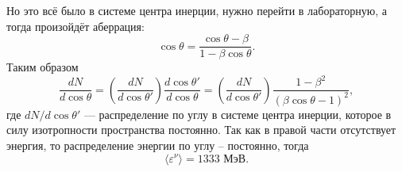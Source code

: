 Но это всё было в системе центра инерции, нужно перейти в лабораторную, а тогда произойдёт аберрация:
\begin{equation*}
	\cos \theta = 
	\frac{\cos \theta - \beta}{1 - \beta \cos \theta}.
\end{equation*}
Таким образом
\begin{equation*}
	\frac{d N}{d \cos \theta} = \left(\frac{d N}{d \cos \theta'}\right) \frac{d \cos \theta'}{d \cos \theta} 
	=
	\left(\frac{d N}{d \cos \theta'}\right) \frac{1 - \beta^2}{(\beta \cos \theta - 1)^2},
\end{equation*}
где $d N/d \cos \theta'$ --- распределение по углу в системе центра инерции, которое в силу изотропности пространства постоянно. Так как в правой части отсутствует энергия, то распределение энергии по углу -- постоянно, тогда 
\begin{equation*}
	\langle \varepsilon^\nu\rangle = 1333 \text{\ МэВ}.
\end{equation*}